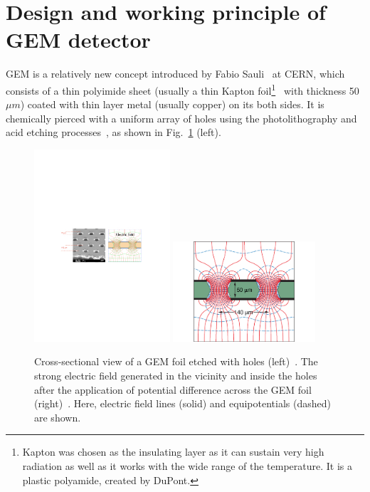 \section{Design and working principle of GEM detector} %
\label{sec:design_and_working_principle_of_gem}
GEM is a relatively new concept introduced by Fabio Sauli~\cite{Sauli1997} at CERN, which consists of a thin polyimide sheet (usually a thin Kapton foil\footnote{Kapton was chosen as the insulating layer as it can sustain very high radiation as well as it works with the wide range of the temperature. It is a plastic polyamide, created by DuPont.}~\cite{Kapton-sheet} with thickness 50 $\mu m$) coated with thin layer metal (usually copper) on its both sides.
It is chemically pierced with a uniform array of holes using the photolithography and acid etching processes~\cite{Benlloch1998}, as shown in Fig.~\ref{fig:gem} (left).
\begin{figure}[!htbp]
    \centering
    \includegraphics[width=0.45\textwidth]{figures/GEM/KEKDTP3.pdf}
    \includegraphics[width=0.47\textwidth]{figures/GEM/35-Figure28-10-1.pdf}
    \caption{Cross-sectional view of a GEM foil etched with holes (left)~\cite{Colaleo:2021453}. The strong electric field generated in the vicinity and inside the holes after the application of potential difference across the GEM foil (right)~\cite{PDG2018}. Here, electric field lines (solid) and equipotentials (dashed) are shown.}
    \label{fig:gem}
\end{figure}

